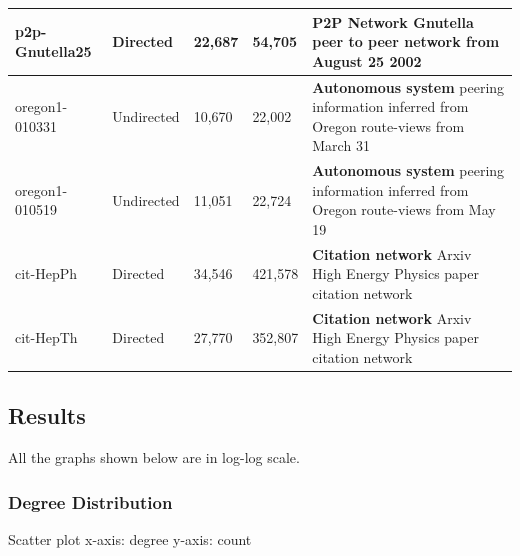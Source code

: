 \begin{table}[H]
\begin{tabular}{| l | l | l | l | p{8cm} |}
	  p2p-Gnutella25 & Directed & 22,687 & 54,705 & \textbf{P2P Network} Gnutella peer to peer network from August 25 2002 \\ \hline

	  oregon1-010331 & Undirected & 10,670 & 22,002 & \textbf{Autonomous system} peering information inferred from Oregon route-views from March 31 \\ \hline

	  oregon1-010519 & Undirected & 11,051 & 22,724 & \textbf{Autonomous system} peering information inferred from Oregon route-views from May 19 \\ \hline

	  cit-HepPh & Directed & 34,546 & 421,578 & \textbf{Citation network} Arxiv High Energy Physics paper citation network \\ \hline

	  cit-HepTh & Directed & 27,770 & 352,807 & \textbf{Citation network} Arxiv High Energy Physics paper citation network \\
	  
	  \hline  
	\end{tabular}
\end{table}

\subsection{Results}

All the graphs shown below are in log-log scale.

\subsubsection{Degree Distribution}

Scatter plot \quad x-axis: degree \quad y-axis: count

